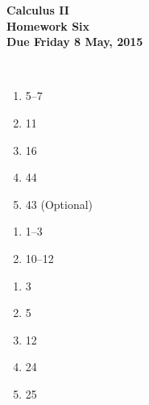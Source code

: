 \documentclass[12pt]{article}
\begin{document}
\pagestyle{empty}
 
\begin{center}
{\large {\bf Calculus II}}\\
\medskip
{\large {\bf Homework Six}}\\
\medskip
{ {\bf Due Friday 8 May, 2015}}\\
\end{center}

\hspace{2mm}\\
   


\begin{enumerate}
\setlength{\itemsep}{-1mm}
  \item 5--7
  \item 11
  \item 16
  \item 44
  \item 43 (Optional)
\end{enumerate}


\begin{enumerate}
\setlength{\itemsep}{-1mm}
  \item 1--3
  \item 10--12
\end{enumerate}

  

\begin{enumerate}
\setlength{\itemsep}{-1mm}
  \item 3
  \item 5
  \item 12
  \item 24
  \item 25
\end{enumerate}

%
\end{document}
